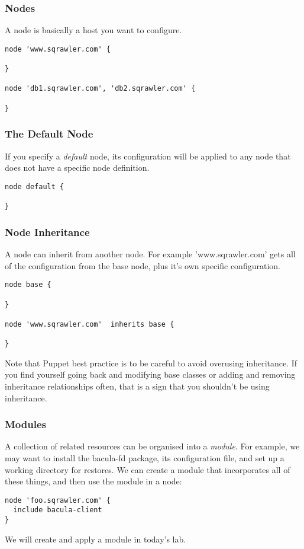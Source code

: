 \documentclass[10pt]{beamer}
\begin{document}
\begin{frame}[fragile]
  \frametitle{Nodes}

A node is basically a host you want to configure.
\begin{verbatim}
node 'www.sqrawler.com' {

}

node 'db1.sqrawler.com', 'db2.sqrawler.com' {

}
\end{verbatim}


\end{frame}

\begin{frame}[fragile]
  \frametitle{The Default Node}

If you specify a \emph{default} node, its configuration will be applied to any node that does not have a specific node definition.
\begin{verbatim}
node default {

}
\end{verbatim}


\end{frame}

\begin{frame}[fragile]
  \frametitle{Node Inheritance}

A node can inherit from another node.  For example 'www.sqrawler.com' gets all of the configuration from the base node, plus it's own specific configuration.

\begin{verbatim}
node base {

}

node 'www.sqrawler.com'  inherits base {

}
\end{verbatim}

Note that Puppet best practice is to be careful to avoid overusing inheritance.  If you find yourself going back and modifying base classes or adding and removing inheritance relationships often, that is a sign that you shouldn't be using inheritance.

\end{frame}

\begin{frame}[fragile]
  \frametitle{Modules}
  A collection of related resources can be organised into a \emph{module}.  For example, we may want to install the bacula-fd package, its configuration file, and set up a working directory for restores.  We can create a module that incorporates all of these things, and then use the module in a node:

\begin{verbatim}
node 'foo.sqrawler.com' {
  include bacula-client
}
\end{verbatim}

We will create and apply a module in today's lab.



\end{frame}
\end{document}
